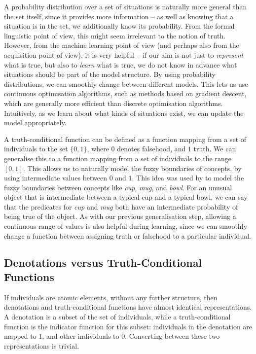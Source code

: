 \documentclass[a4paper,11pt]{article}
\begin{document}
A probability distribution over a set of situations
is naturally more general than the set itself,
since it provides more information --
as well as knowing that a situation is in the set,
we additionally know its probability.
From the formal linguistic point of view, this might seem irrelevant to the notion of truth.
However, from the machine learning point of view
(and perhaps also from the acquisition point of view),
it is very helpful --
if our aim is not just to \textit{represent} what is true,
but also to \textit{learn} what is true,
we do not know in advance what situations should be part of the model structure.
By using probability distributions,
we can smoothly change between different models.
This lets us use continuous optimisation algorithms,
such as methods based on gradient descent,
which are generally more efficient than discrete optimisation algorithms.
Intuitively, as we learn about what kinds of situations exist,
we can update the model appropriately.

A truth-conditional function can be defined as
a function mapping from a set of individuals to the set $\{0,1\}$,
where $0$ denotes falsehood, and $1$ truth.
We can generalise this to
a function mapping from a set of individuals to the range $[0,1]$.
This allows us to naturally model the fuzzy boundaries of concepts,
by using intermediate values between $0$ and $1$.
This idea was used by \citet{labov1973cup}
to model the fuzzy boundaries between concepts like \textit{cup}, \textit{mug}, and \textit{bowl}.
For an unusual object that is intermediate between
a typical cup and a typical bowl,
we can say that the predicates for \textit{cup} and \textit{mug}
both have an intermediate probability of being true of the object.
As with our previous generalisation step,
allowing a continuous range of values is also helpful during learning,
since we can smoothly change a function between assigning truth or falsehood to a particular individual.


\subsection{Denotations versus Truth-Conditional Functions}
\label{sec:truth}

If individuals are atomic elements, without any further structure,
then denotations and truth-conditional functions have almost identical representations.
A denotation is a subset of the set of individuals,
while a truth-conditional function is the indicator function for this subset:
individuals in the denotation are mapped to $1$, and other individuals to $0$.
Converting between these two representations is trivial.
\end{document}
